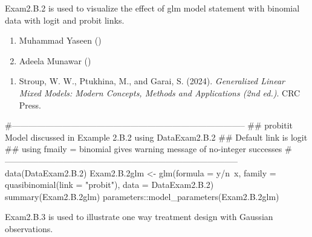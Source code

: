\documentclass[a4paper]{book}
\begin{document}
%
\begin{Description}
Exam2.B.2 is used to visualize the effect of glm model statement with binomial data with logit and probit links.
\end{Description}
%
\begin{Author}
\begin{enumerate}

\item{}  Muhammad Yaseen ()
\item{} Adeela Munawar ()

\end{enumerate}

\end{Author}
%
\begin{References}
\begin{enumerate}

\item{} Stroup, W. W., Ptukhina, M., and Garai, S. (2024).
\emph{Generalized Linear Mixed Models: Modern Concepts, Methods and Applications (2nd ed.)}.
CRC Press.

\end{enumerate}

\end{References}
%
\begin{SeeAlso}
\end{SeeAlso}
%
\begin{Examples}
\begin{ExampleCode}
#-----------------------------------------------------------------------------------
## probitit Model  discussed in Example 2.B.2 using DataExam2.B.2
## Default link is logit
## using fmaily = binomial gives warning message of no-integer successes
#-----------------------------------------------------------------------------------
data(DataExam2.B.2)
Exam2.B.2glm <- glm(formula = y/n~x, family = quasibinomial(link = "probit"), data =  DataExam2.B.2)
summary(Exam2.B.2glm)
parameters::model_parameters(Exam2.B.2glm)
\end{ExampleCode}
\end{Examples}
%
\begin{Description}
Exam2.B.3 is used to illustrate one way treatment design with Gaussian observations.
\end{Description}
\end{document}
